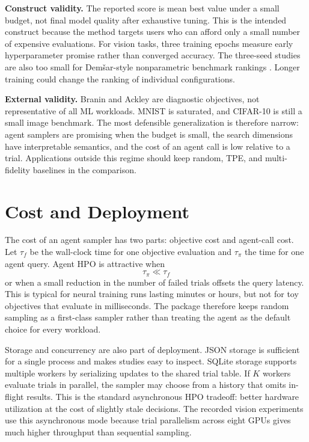 \documentclass[letterpaper]{article}
\begin{document}
\textbf{Construct validity.} The reported score is mean best value under a
small budget, not final model quality after exhaustive tuning. This is the
intended construct because the method targets users who can afford only a small
number of expensive evaluations. For vision tasks, three training epochs measure
early hyperparameter promise rather than converged accuracy. The three-seed
studies are also too small for Dem{\v{s}}ar-style nonparametric benchmark
rankings \cite{demsar2006statistical}. Longer training could change the ranking
of individual configurations.

\textbf{External validity.} Branin and Ackley are diagnostic objectives, not
representative of all ML workloads. MNIST is saturated, and CIFAR-10 is still a
small image benchmark. The most defensible generalization is therefore narrow:
agent samplers are promising when the budget is small, the search dimensions
have interpretable semantics, and the cost of an agent call is low relative to a
trial. Applications outside this regime should keep random, TPE, and
multi-fidelity baselines in the comparison.

\section{Cost and Deployment}

The cost of an agent sampler has two parts: objective cost and agent-call cost.
Let $\tau_f$ be the wall-clock time for one objective evaluation and $\tau_\pi$
the time for one agent query. Agent HPO is attractive when
\begin{equation}
  \tau_\pi \ll \tau_f
\end{equation}
or when a small reduction in the number of failed trials offsets the query
latency. This is typical for neural training runs lasting minutes or hours, but
not for toy objectives that evaluate in milliseconds. The package therefore
keeps random sampling as a first-class sampler rather than treating the agent as
the default choice for every workload.

Storage and concurrency are also part of deployment. JSON storage is sufficient
for a single process and makes studies easy to inspect. SQLite storage supports
multiple workers by serializing updates to the shared trial table. If $K$
workers evaluate trials in parallel, the sampler may choose from a history that
omits in-flight results. This is the standard asynchronous HPO tradeoff: better
hardware utilization at the cost of slightly stale decisions. The recorded
vision experiments use this asynchronous mode because trial parallelism across
eight GPUs gives much higher throughput than sequential sampling.
\end{document}
